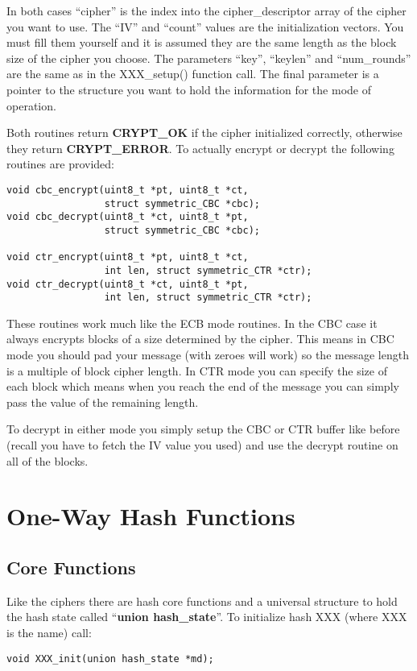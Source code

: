 \documentclass{book}
\begin{document}
In both cases ``cipher'' is the index into the cipher\_descriptor array of the cipher you want to use.  The ``IV'' and
``count'' values are the initialization vectors.  You must fill them yourself and it is assumed they are the same length
as the block size of the cipher you choose.  The parameters ``key'', ``keylen'' and ``num\_rounds'' are the same as in
the XXX\_setup() function call.  The final parameter is a pointer to the structure you want to hold the information for
the mode of operation.

Both routines return {\bf CRYPT\_OK} if the cipher initialized correctly, otherwise they return {\bf CRYPT\_ERROR}.  To 
actually encrypt or decrypt the following routines are provided:
\begin{verbatim}
void cbc_encrypt(uint8_t *pt, uint8_t *ct, 
                 struct symmetric_CBC *cbc);
void cbc_decrypt(uint8_t *ct, uint8_t *pt,
                 struct symmetric_CBC *cbc);

void ctr_encrypt(uint8_t *pt, uint8_t *ct, 
                 int len, struct symmetric_CTR *ctr);
void ctr_decrypt(uint8_t *ct, uint8_t *pt, 
                 int len, struct symmetric_CTR *ctr);
\end{verbatim}

These routines work much like the ECB mode routines.  In the CBC case it always encrypts blocks of a size determined
by the cipher.  This means in CBC mode you should pad your message (with zeroes will work) so the message length
is a multiple of block cipher length.  In CTR mode you can specify the size of each block which means when you reach
the end of the message you can simply pass the value of the remaining length.

To decrypt in either mode you simply setup the CBC or CTR buffer like before (recall you have to fetch the IV value you used)
and use the decrypt routine on all of the blocks.

\chapter{One-Way Hash Functions}
\section{Core Functions}

Like the ciphers there are hash core functions and a universal structure to hold the hash state called 
``{\bf union hash\_state}''.  To initialize hash XXX (where XXX is the name) call:
\begin{verbatim}
void XXX_init(union hash_state *md);
\end{verbatim}
\end{document}
